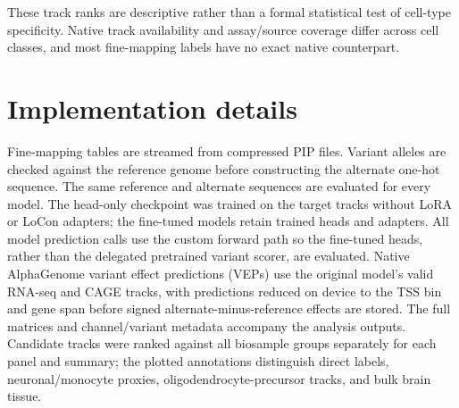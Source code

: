\documentclass[11pt]{article}
\begin{document}
These track ranks are descriptive rather than a formal statistical test of
cell-type specificity. Native track availability and assay/source coverage
differ across cell classes, and most fine-mapping labels have no exact native
counterpart.

\section{Implementation details}
Fine-mapping tables are streamed from compressed PIP files. Variant alleles
are checked against the reference genome before constructing the alternate
one-hot sequence. The same reference and alternate sequences are evaluated
for every model. The head-only checkpoint was trained on the target tracks
without LoRA or LoCon adapters; the fine-tuned models retain trained heads and
adapters. All model prediction calls use the custom forward path so the
fine-tuned heads, rather than the delegated pretrained variant scorer, are
evaluated. Native AlphaGenome variant effect predictions (VEPs) use the original model's valid RNA-seq and
CAGE tracks, with predictions reduced on device to the TSS bin and gene span
before signed alternate-minus-reference effects are stored. The full matrices
and channel/variant metadata accompany the analysis outputs. Candidate tracks
were ranked against all biosample groups separately for each panel and summary;
the plotted annotations distinguish direct labels, neuronal/monocyte proxies,
oligodendrocyte-precursor tracks, and bulk brain tissue.
\end{document}
